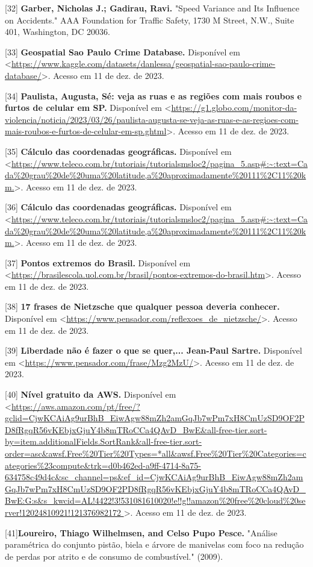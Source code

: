 [32] \textbf{Garber, Nicholas J.; Gadirau, Ravi.} "Speed Variance and Its Influence on Accidents." AAA Foundation for Traffic Safety, 1730 M Street, N.W., Suite 401, Washington, DC 20036.

[33] \textbf{Geospatial Sao Paulo Crime Database.} Disponível em <\url{https://www.kaggle.com/datasets/danlessa/geospatial-sao-paulo-crime-database/}>. Acesso em 11 de dez. de 2023.

[34] \textbf{Paulista, Augusta, Sé: veja as ruas e as regiões com mais roubos e furtos de celular em SP.} Disponível em <\url{https://g1.globo.com/monitor-da-violencia/noticia/2023/03/26/paulista-augusta-se-veja-as-ruas-e-as-regioes-com-mais-roubos-e-furtos-de-celular-em-sp.ghtml}>. Acesso em 11 de dez. de 2023.

[35] \textbf{Cálculo das coordenadas geográficas.} Disponível em <\url{https://www.teleco.com.br/tutoriais/tutorialsmsloc2/pagina_5.asp#:~:text=Cada%20grau%20de%20uma%20latitude,a%20aproximadamente%20111%2C11%20km.}>. Acesso em 11 de dez. de 2023.


[36] \textbf{Cálculo das coordenadas geográficas.} Disponível em <\url{https://www.teleco.com.br/tutoriais/tutorialsmsloc2/pagina_5.asp#:~:text=Cada%20grau%20de%20uma%20latitude,a%20aproximadamente%20111%2C11%20km.}>. Acesso em 11 de dez. de 2023.


[37] \textbf{Pontos extremos do Brasil.} Disponível em <\url{https://brasilescola.uol.com.br/brasil/pontos-extremos-do-brasil.htm}>. Acesso em 11 de dez. de 2023.

[38] \textbf{17 frases de Nietzsche que qualquer pessoa deveria conhecer.} Disponível em <\url{https://www.pensador.com/reflexoes_de_nietzsche/}>. Acesso em 11 de dez. de 2023.


[39] \textbf{Liberdade não é fazer o que se quer,... Jean-Paul Sartre.} Disponível em <\url{https://www.pensador.com/frase/Mzg2MzU/}>. Acesso em 11 de dez. de 2023.


[40] \textbf{Nível gratuito da AWS.} Disponível em <\url{https://aws.amazon.com/pt/free/?gclid=CjwKCAiAg9urBhB_EiwAgw88mZh2amGqJb7wPm7xH8CmUzSD9OF2PD8fRgqR56vKEbjxGjuY4b8mTRoCCa4QAvD_BwE&all-free-tier.sort-by=item.additionalFields.SortRank&all-free-tier.sort-order=asc&awsf.Free%
}>. Acesso em 11 de dez. de 2023.

[41]\textbf{Loureiro, Thiago Wilhelmsen, and Celso Pupo Pesce.} "Análise paramétrica do conjunto pistão, biela e árvore de manivelas com foco na redução de perdas por atrito e de consumo de combustível." (2009).



